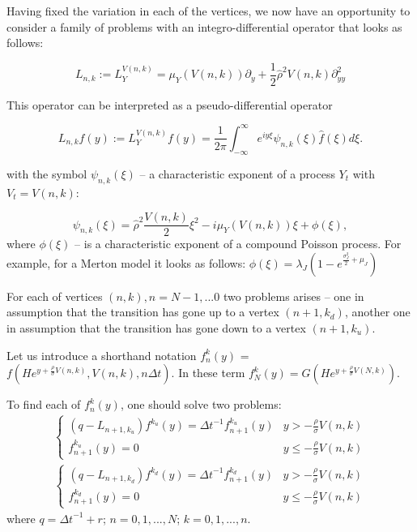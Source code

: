\documentclass[a4paper]{jpconf}
\begin{document}

Having fixed the variation in each of the vertices, we now have an opportunity to consider a family of problems with an integro-differential operator that looks as follows:

$$L_{n,k} := L_{Y}^{V(n,k)} = \mu_{Y}(V(n,k)) \partial_{y} + \frac{1}{2}\hat{\rho}^2 V(n,k)\partial^2_{yy}$$

This operator can be interpreted as a pseudo-differential operator 

$$L_{n,k}f(y) := L_{Y}^{V(n,k)}f(y) = \frac{1}{2\pi}\int^\infty_{-\infty}e^{iy\xi}\psi_{n,k}(\xi)\hat{f}(\xi)d\xi.$$

with the symbol $\psi_{n,k}(\xi)$ -- a characteristic exponent of a process $Y_t$ with $V_t = V(n,k)$:

\begin{equation*}
\psi_{n,k}(\xi) = \hat{\rho}^2\frac{V(n,k)}{2}\xi^2 - i\mu_Y(V(n,k))\xi + \phi(\xi),
\end{equation*}
where $\phi(\xi)$ -- is a characteristic exponent of a compound Poisson process. For example, for a Merton model it looks as follows: $\phi(\xi) = \lambda_J(1-e^{\frac{\sigma_J^2}{2} + \mu_J})$

For each of vertices $(n,k), n=N-1,...0$ two problems arises -- one in assumption that the transition has gone up to a vertex $(n+1,k_d)$, another one in assumption that the transition has gone down to a vertex $(n+1,k_u)$. 

Let us introduce a shorthand notation $f_{n}^{k}(y)$ = $f(He^{y+\frac{\rho}{\sigma}V(n,k)},V(n,k),n\Delta t)$. In these term $f_{N}^{k}(y) = G(He^{y+\frac{\rho}{\sigma}V(N,k)})$.

To find each of $f_{n}^{k}(y)$, one should solve two problems:
\begin{gather}
	\begin{cases}
	(q - L_{n+1,k_{u}})f^{k_{u}}(y) = {\Delta t}^{-1} f^{k_u}_{n+1}(y) & y > - \frac{\rho}{\sigma}V(n,k) \\
	f_{n+1}^{k_{u}}(y) = 0 & y \le - \frac{\rho}{\sigma}V(n,k)
	\end{cases}
	\end{gather}
\begin{gather}
	\begin{cases}
	(q - L_{n+1,k_{d}})f^{k_{d}}(y) = {\Delta t}^{-1} f^{k_d}_{n+1}(y) & y > - \frac{\rho}{\sigma}V(n,k) \\
	f_{n+1}^{k_{d}}(y) = 0 & y \le - \frac{\rho}{\sigma}V(n,k)
	\end{cases}
	\end{gather}
where $q = {\Delta t}^{-1} + r$; $n = 0,1,...,N$; $k = 0,1,...,n$.
\end{document}
